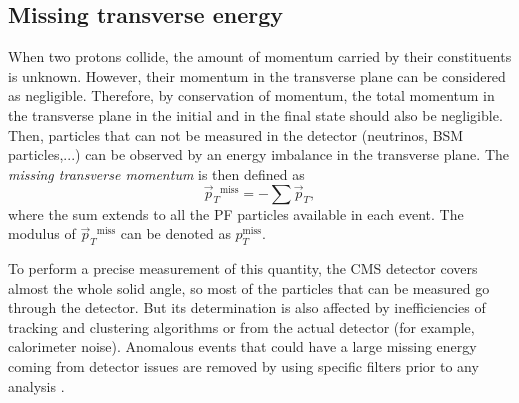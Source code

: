 \documentclass[../main.tex]{subfiles}
\begin{document}
\subsection{Missing transverse energy}
\label{intro:subsec:met}

When two protons collide, the amount of momentum carried by their constituents is unknown. However, their momentum in the transverse plane can be considered as negligible. Therefore, by conservation of momentum, the total momentum in the transverse plane in the initial and in the final state should also be negligible. Then, particles that can not be measured in the detector (neutrinos, BSM particles,...) can be observed by an energy imbalance in the transverse plane. The \textit{missing transverse momentum} is then defined as
\begin{equation}
	\vec{p}_T{}^{\text{miss}} = - \sum \vec{p}_T,
\end{equation}
where the sum extends to all the PF particles available in each event. The modulus of $\vec{p}_T{}^{\text{miss}}$ can be denoted as $p_T^{\text{miss}}$.

To perform a precise measurement of this quantity, the CMS detector covers almost the whole solid angle, so most of the particles that can be measured go through the detector. But its determination is also affected by inefficiencies of tracking and clustering algorithms or from the actual detector (for example, calorimeter noise). Anomalous events that could have a large missing energy coming from detector issues are removed by using specific filters prior to any analysis \cite{intro:id:met}.
\end{document}
